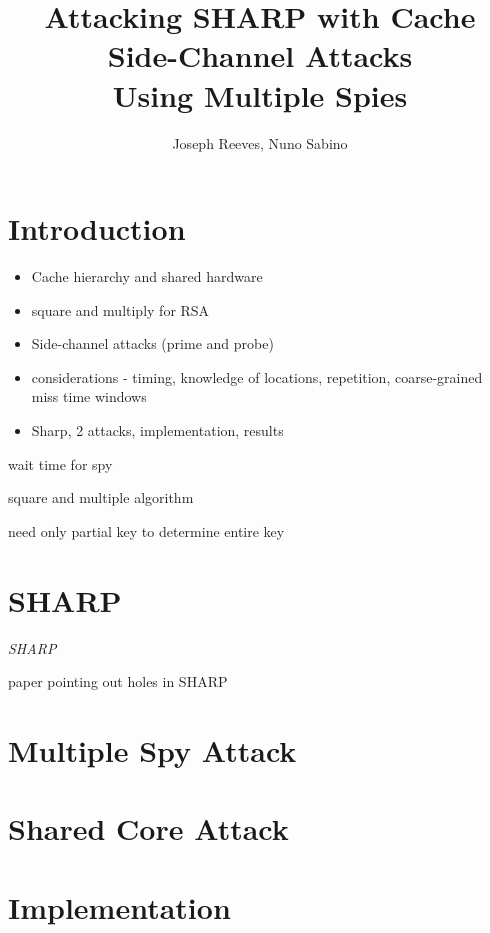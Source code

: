 \documentclass[12pt]{article}
\title{Attacking SHARP with Cache Side-Channel Attacks\\Using Multiple Spies}
\author{Joseph Reeves, Nuno Sabino}
\begin{document}
\maketitle


\section{Introduction}

\begin{itemize}

\item Cache hierarchy and shared hardware

\item square and multiply for RSA

\item Side-channel attacks (prime and probe)

\item considerations - timing, knowledge of locations, repetition, coarse-grained miss time windows

\item Sharp, 2 attacks, implementation, results

\end{itemize}

wait time for spy~\cite{waitTime}

square and multiple algorithm~\cite{exp}

need only partial key to determine entire key~\cite{partKey}

\section{SHARP}

{\it SHARP}~\cite{sharp}

paper pointing out holes in SHARP~\cite{howSharp}

\section{Multiple Spy Attack}



\section{Shared Core Attack}

\section{Implementation}
\end{document}
